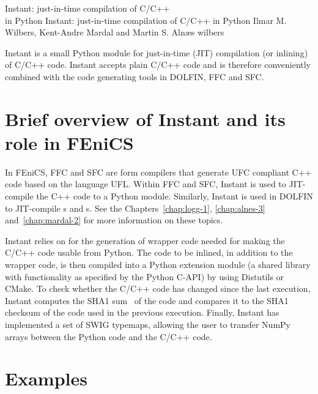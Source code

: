               {Instant: just-in-time compilation of C/C++ \\ in Python}
              {Instant: just-in-time compilation of C/C++ in Python}
              {Ilmar M. Wilbers, Kent-Andre Mardal and Martin S. Aln{\ae}s}
              {wilbers}

Instant is a small Python module for just-in-time (JIT)
compilation (or inlining) of C/C++ code. Instant accepts plain C/C++
code and is therefore conveniently combined with the code generating
tools in DOLFIN, FFC and SFC.

\section{Brief overview of Instant and its role in FEniCS}

In FEniCS, FFC and SFC are form compilers that generate UFC compliant C++
code based on the language UFL.  Within FFC and SFC, Instant is used to
JIT-compile the C++ code to a Python module.  Similarly, Instant is used
in DOLFIN to JIT-compile s and s.  See the
Chapters~\ref{chap:logg-1}, \ref{chap:alnes-3} and~\ref{chap:mardal-2}
for more information on these topics.

Instant relies on \citet{www:swig,Beazley2006} for the generation of
wrapper code needed for making the C/C++ code usable from Python.  The
code to be inlined, in addition to the wrapper code, is then compiled
into a Python extension module (a shared library with functionality as
specified by the Python C-API) by using Distutils or CMake. To check
whether the C/C++ code has changed since the last execution, Instant
computes the SHA1 sum~\citep{HansenWollman} of the code and compares
it to the SHA1 checksum of the code used in the previous
execution. Finally, Instant has implemented a set of
SWIG typemaps, allowing the user to transfer NumPy
arrays between the Python code and the C/C++ code.

\section{Examples}

\label{wilbers:sec:examples}
